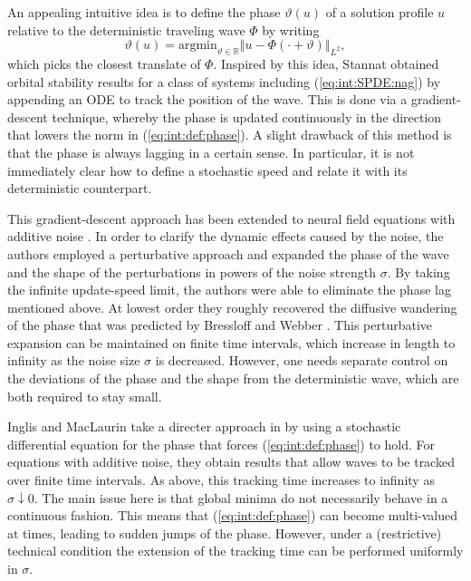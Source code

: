 \documentclass[10pt]{articleHJ}
\newcommand{\Real}{\mathbb{R}}							%
\newcommand{\norm}[1]{\left\Vert#1\right\Vert}		%
\newcommand{\sref}[1]{(\ref{#1})}                       %
\numberwithin{equation}{section}
\begin{document}
An appealing intuitive idea is to define the phase $\vartheta(u)$ of a solution profile $u$
relative to the deterministic traveling wave $\Phi$
by writing
\begin{equation}
\label{eq:int:def:phase}
\vartheta(u) = \mathrm{argmin}_{\vartheta \in \Real} \norm{ u - \Phi(\cdot + \vartheta) }_{L^2},
\end{equation}
which picks the closest translate of $\Phi$.
Inspired by this idea,
Stannat \cite{Stannat,stannat2014stability} 
obtained
orbital stability results for a class of
systems including \sref{eq:int:SPDE:nag} by appending
an ODE to track the position of the wave. This is done via a gradient-descent
technique, whereby the phase is updated continuously in the direction
that lowers the norm in \sref{eq:int:def:phase}. A slight drawback of this method
is that the phase is always lagging in a certain sense. In particular, it is not immediately clear
how to define a stochastic speed and relate it with its deterministic counterpart.

This gradient-descent approach has been extended
to neural field equations with additive noise \cite{Lang,LangStannat2016l2}.
In order to clarify the dynamic effects caused by the noise, the authors
employed a perturbative approach and expanded the phase of the wave and the shape of
 the perturbations
in powers of the noise strength $\sigma$. By taking the infinite update-speed limit, the authors were able
to eliminate the phase lag mentioned above.  At lowest order they roughly recovered the diffusive
wandering of the phase that was predicted
by Bressloff and Webber \cite{Bressloff}. This perturbative expansion
can be maintained on finite time intervals, which increase in length to infinity
as the noise size $\sigma$ is decreased. However, one needs
separate control on the deviations
of the  phase and the shape from the deterministic wave,
which are both required to stay small.


Inglis and MacLaurin take a directer approach in \cite{Inglis}
by using a stochastic differential equation for the phase that forces \sref{eq:int:def:phase} to hold.
For equations with additive noise, they obtain results that allow waves
to be tracked over finite time intervals. As above, this tracking time increases
to infinity as $\sigma \downarrow 0$.
The main issue
here is that global minima do not necessarily behave in a continuous fashion.
This means that \sref{eq:int:def:phase} can become multi-valued at times, leading
to sudden jumps of the phase.
However, under a (restrictive) technical condition the extension of the tracking time
can be performed uniformly in $\sigma$.
\end{document}

